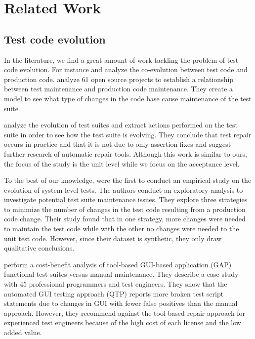 \chapter{Related Work}
\label{related}

\section{Test code evolution}
\label{related-evolution}

In the literature, we find a great amount of work tackling the problem of test code evolution. For instance \citep{Zaidman2011} and \citep{Levin2017} analyze the co-evolution between test code and production code. \citep{Levin2017} analyze 61 open source projects to establish a relationship between test maintenance and production code maintenance. They create a model to see what type of changes in the code base cause maintenance of the test suite.

\citep{Pinto2012} analyze the evolution of test suites and extract actions performed on the test suite in order to see how the test suite is evolving. They conclude that test repair occurs in practice and that it is not due to only assertion fixes and suggest further research of automatic repair tools. Although this work is similar to ours, the focus of the study is the unit level while we focus on the acceptance level.

To the best of our knowledge, \citep{Skoglund2004} were the first to conduct an empirical study on the evolution of system level tests. The authors conduct an exploratory analysis to investigate potential test suite maintenance issues. They explore three strategies to minimize the number of changes in the test code resulting from a production code change. Their study found that in one strategy, more changes were needed to maintain the test code while with the other no changes were needed to the unit test code. However, since their dataset is synthetic, they only draw qualitative conclusions.

\citep{Grechanik2009} perform a cost-benefit analysis of tool-based GUI-based application (GAP) functional test suites versus manual maintenance. They describe a case study with 45 professional programmers and test engineers. They show that the automated GUI testing approach (QTP) reports more broken test script statements due to changes in GUI with fewer false positives than the manual approach. However, they recommend against the tool-based repair approach for experienced test engineers because of the high cost of each license and the low added value.

